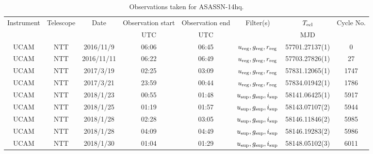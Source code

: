 \begin{table}
	\begin{center}
		\begin{tabular}{cccccccc}
			\hline
			Instrument & Telescope & Date & Observation start & Observation end & Filter(s) & $T_{\rm ecl}$ & Cycle No. \\
			 &  &  & UTC & UTC &  & MJD &  \\
			\hline
			\hline
			 UCAM & NTT & 2016/11/9  & 06:06 & 06:45 & $u_{\rm reg},g_{\rm reg},r_{\rm reg}$ & 57701.27137(1)                                                                                                            &                                           0 \\
			 UCAM & NTT & 2016/11/11 & 06:22 & 06:49 & $u_{\rm reg},g_{\rm reg},r_{\rm reg}$ & 57703.27826(1)                                                                                                            &                                          27 \\
			 UCAM & NTT & 2017/3/19  & 02:25 & 03:09 & $u_{\rm reg},g_{\rm reg},r_{\rm reg}$ & 57831.12065(1)                                                                                                            &                                        1747 \\
			 UCAM & NTT & 2017/3/21  & 23:59 & 00:44 & $u_{\rm reg},g_{\rm reg},r_{\rm reg}$ & 57834.01942(1)                                                                                                            &                                        1786 \\
			 UCAM & NTT & 2018/1/23  & 00:55 & 01:48 & $u_{\rm sup},g_{\rm sup},i_{\rm sup}$ & 58141.06425(1)                                                                                                            &                                        5917 \\
			 UCAM & NTT & 2018/1/25  & 01:19 & 01:57 & $u_{\rm sup},g_{\rm sup},i_{\rm sup}$ & 58143.07107(2)                                                                                                            &                                        5944 \\
			 UCAM & NTT & 2018/1/28  & 02:28 & 03:05 & $u_{\rm sup},g_{\rm sup},i_{\rm sup}$ & 58146.11846(2)                                                                                                            &                                        5985 \\
			 UCAM & NTT & 2018/1/28  & 04:09 & 04:49 & $u_{\rm sup},g_{\rm sup},i_{\rm sup}$ & 58146.19283(2)                                                                                                            &                                        5986 \\
			 UCAM & NTT & 2018/1/30  & 01:04 & 01:29 & $u_{\rm sup},g_{\rm sup},i_{\rm sup}$ & 58148.05102(3)                                                                                                            &                                        6011 \\
			\hline
			\end{tabular}
	\end{center}
	\caption{Observations taken for ASASSN-14hq.}
	\label{table:observing:observation logs ASASSN-14hq}
\end{table}